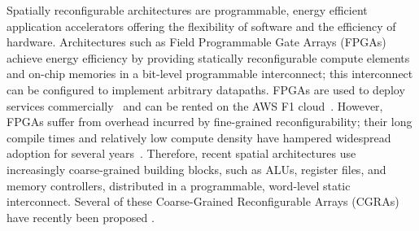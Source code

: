 %
%

Spatially reconfigurable architectures are programmable, energy efficient application accelerators offering the flexibility of software and the efficiency of hardware.
Architectures such as Field Programmable Gate Arrays (FPGAs) achieve energy efficiency by providing statically reconfigurable compute elements and on-chip memories in a bit-level programmable interconnect; this interconnect can be configured to implement arbitrary datapaths. FPGAs are used to deploy services commercially~\cite{microsoft, baidu, deephi}
and can be rented on the AWS F1 cloud~\cite{aws}. However, FPGAs suffer from overhead incurred by fine-grained reconfigurability; their long compile times
and relatively low compute density have hampered widespread adoption for several years~\cite{bolsens, calhoun, fpgaPower, fpgaSurvey}. 
Therefore, recent spatial architectures use
increasingly coarse-grained building blocks, such as ALUs, register files, and memory controllers, distributed in a programmable, word-level static interconnect.
Several of these Coarse-Grained Reconfigurable Arrays (CGRAs) have recently been proposed \cite{adres, kress, dyser, piperench, tartan, hrl, ti, hycube, plasticine}.

